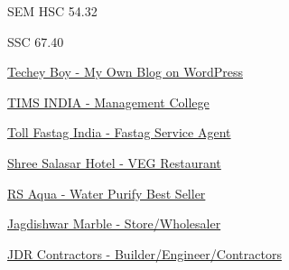 \documentclass[10pt,a4paper,ragged2e,withhyper]{altacv}
\begin{document}
\begin{paracol}{2}
\divider

\item SEM HSC 54.32 %

\divider


\item SSC 67.40 %



\newpage



\divider

\href{https://techeyboy.com/}{Techey Boy - My Own Blog on WordPress}

\divider

\href{http://www.timsindia.com/}{TIMS INDIA - Management College}

\divider

\href{https://tollfastag.in/}{Toll Fastag India - Fastag Service Agent}

\divider

\href{https://hotelsalasar.com/}{Shree Salasar Hotel - VEG Restaurant}

\divider

\href{https://rsaqua.in/}{RS Aqua - Water Purify Best Seller}

\divider

\href{https://jagdishwarmarble.com/}{Jagdishwar Marble - Store/Wholesaler}

\divider

\href{https://jdrcontractors.com/}{JDR Contractors - Builder/Engineer/Contractors}

\divider

\switchcolumn




\divider


\end{paracol}
\end{document}
